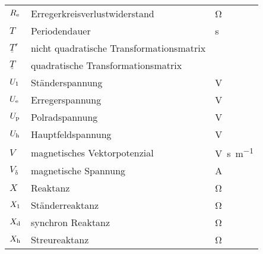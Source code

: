 \begin{tabularx}{\textwidth}{lll}
$R_{\mathrm{e}}$	&	Erregerkreisverlustwiderstand &	\si{\ohm}\\
$T$ & Periodendauer & \si{\second} \\
$\underline{T}'$ & nicht quadratische Transformationsmatrix & \\
$\underline{T}$ & quadratische Transformationsmatrix & \\
$U_{\mathrm{1}}$ & Ständerspannung & \si{\volt}\\
$U_{\mathrm{e}}$ & Erregerspannung & \si{\volt}\\
$U_{\mathrm{p}}$ & Polradspannung & \si{\volt}\\
$U_{\mathrm{h}}$ & Hauptfeldspannung & \si{\volt}\\
$V$ &	magnetisches Vektorpotenzial&	\si{\volt\second\per\meter}\\
$V_\mathrm{\delta}$		&	magnetische Spannung		&	\si{\ampere} \\
$X$	& 	Reaktanz & \si{\ohm}\\
$X_{\mathrm{1}}$	& 	Ständerreaktanz & \si{\ohm}\\
$X_{\mathrm{d}}$	& 	synchron Reaktanz & \si{\ohm}\\
$X_{\mathrm{h}}$	& 	Streureaktanz & \si{\ohm}\\
\bottomrule
\end{tabularx}

